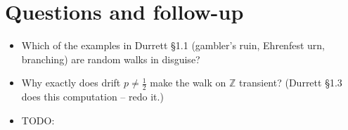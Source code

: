 \documentclass[11pt]{article}
\newcommand{\1}{\mathbf{1}}
\theoremstyle{notestyle}
\theoremstyle{definition}
\begin{document}
\section{Questions and follow-up}
\begin{itemize}
  \item Which of the examples in Durrett \S1.1 (gambler's ruin, Ehrenfest urn,
    branching) are random walks in disguise?
  \item Why exactly does drift $p \neq \frac{1}{2}$ make the walk on $\mathbb{Z}$
    transient? (Durrett \S1.3 does this computation -- redo it.)
  \item TODO: 
\end{itemize}
\end{document}
